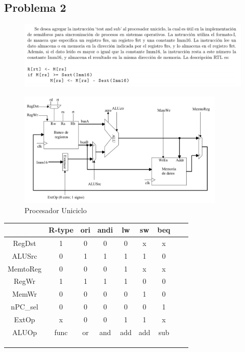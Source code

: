 \documentclass[letterpaper,11pt,notitlepage]{article}
\begin{document}
\subsection*{Problema 2}
\begin{figure}[H]
\begin{center}
\includegraphics[width=\textwidth]{2.png}
\end{center}
\end{figure}
\begin{figure}[H]
\begin{center}
\includegraphics[width=0.88\textwidth,keepaspectratio=true]{unic}
\end{center}
\caption{Procesador Uniciclo}
\end{figure}

\begin{table}[H]
\begin{center}
\begin{tabular}{|c|c|c|c|c|c|c|c|c|} \hline
            & R-type  & ori & andi & lw & sw & beq \\ \hline
RegDst      & 1       & 0   &0     & 0  & x  & x    \\ \hline
ALUSrc      & 0       & 1   &1     & 1  & 1  & 0    \\ \hline
MemtoReg    & 0       & 0   &0     & 1  & x  & x    \\ \hline
RegWr       & 1       & 1   &1     & 1  & 0  & 0    \\ \hline
MemWr       & 0       & 0   &0     & 0  & 1  & 0    \\ \hline
nPC\_sel     & 0       & 0   &0     & 0  & 0  & 1   \\ \hline
ExtOp       & x       & 0   &0     & 1  & 1  & x    \\ \hline
ALUOp       & func    & or  &and   & add& add& sub\\ \hline
  &        &    &    &   &   &    \\ \hline
  &        &    &    &   &   &    \\ \hline
   &        &    &    &   &   &    \\ \hline
\end{tabular}
\end{center}
\end{table}
\end{document}
